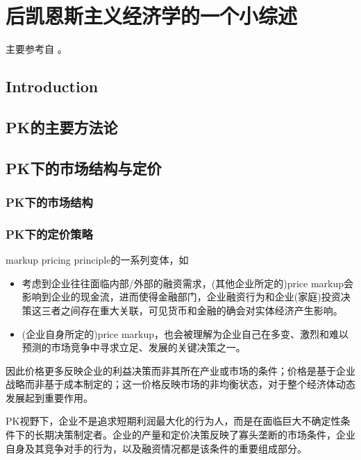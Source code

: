 \chapter{后凯恩斯主义经济学的一个小综述}
\label{sec:PK-user-guide}

主要参考自
\cite{Hart:2015bs}。

\section{Introduction}
\label{sec:PK-intro}

\section{PK的主要方法论}
\label{sec:PK-metho}

\section{PK下的市场结构与定价}
\label{sec:PK-mkt-struc-pricing-decision}

\subsection{PK下的市场结构}
\label{sec:PK-mkt-struc}

\subsection{PK下的定价策略}
\label{sec:PK-pricing-decision}
markup pricing principle的一系列变体，如
\begin{itemize}
\item\cite{Kalecki:1937ks}考虑到企业往往面临内部/外部的融资需求，(其他企业所定的)price markup会影响到企业的现金流，进而使得金融部门，企业融资行为和企业(家庭)投资决策这三者之间存在重大关联，可见货币和金融的确会对实体经济产生影响\citep{Ball:1964vi, Eichner:1973jc,Wood:1975vn, Harcourt:1976kp}。
\item (企业自身所定的)price markup，也会被理解为企业自己在多变、激烈和难以预测的市场竞争中寻求立足、发展的关键决策之一。
\end{itemize}
因此价格更多反映企业的利益决策而非其所在产业或市场的条件；价格是基于企业战略而非基于成本制定的；这一价格反映市场的非均衡状态，对于整个经济体动态发展起到重要作用。

PK视野下，企业不是追求短期利润最大化的行为人，而是在面临巨大不确定性条件下的长期决策制定者。企业的产量和定价决策反映了寡头垄断的市场条件，企业自身及其竞争对手的行为，以及融资情况都是该条件的重要组成部分。


